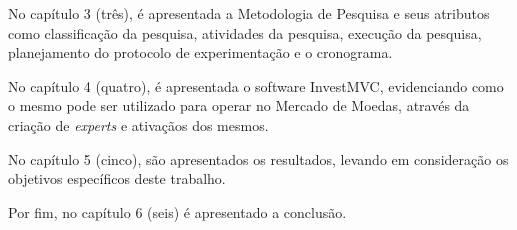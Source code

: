 No capítulo 3 (três), é apresentada a Metodologia de Pesquisa e seus atributos como classificação da pesquisa, atividades da pesquisa, execução da pesquisa, planejamento do protocolo de experimentação e o cronograma.

No capítulo 4 (quatro), é apresentada o software InvestMVC, evidenciando como o mesmo pode ser utilizado para operar no Mercado de Moedas, através da criação de \textit{experts} e ativaçãos dos mesmos.

No capítulo 5 (cinco), são apresentados os resultados, levando em consideração os objetivos específicos deste trabalho.

Por fim, no capítulo 6 (seis) é apresentado a conclusão.
